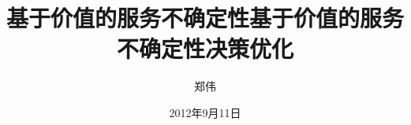 
\subject{计算机科学与技术}
\author{郑伟}
\date{2012年9月11日}

\ifxueweidoctor
  \title{基于价值的服务不确定性} %
\fi
\ifxueweimaster
  \title{基于价值的服务不确定性决策优化}
\fi

\makecover
\clearpage
\setcounter{page}{1}